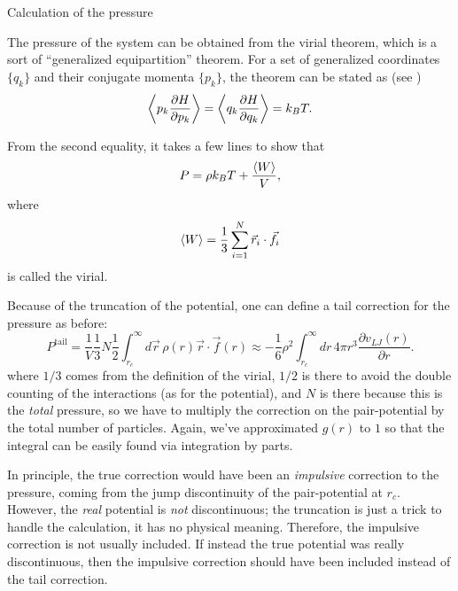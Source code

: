 \documentclass[10pt, compress, protectframetitle, handout]{beamer}
\begin{document}
\begin{frame}[allowframebreaks]{Calculation of the pressure}

	The pressure of the system can be obtained from the \alert{virial theorem}, which is a sort of ``generalized equipartition'' theorem. For a set of generalized coordinates $\{q_k\}$ and their conjugate momenta $\{p_k\}$, the theorem can be stated as (see \cite{Galli})
	\begin{equation}
		\Braket{p_k\frac{\partial H}{\partial p_k}} = \Braket{q_k\frac{\partial H}{\partial q_k}} = k_BT.
	\end{equation}
	
	From the second equality, it takes a few lines to show that
	\begin{equation}
		P = \rho k_B T + \frac{\Braket{W}}{V},
	\end{equation}
	where
	\begin{equation}
		\Braket{W} = \frac{1}{3} \sum_{i=1}^{N} \vec{r}_{i} \cdot \vec{f}_{i} 
	\end{equation}
	is called the \alert{virial}.
	
	Because of the truncation of the potential, one can define a tail correction for the pressure as before:
	\begin{equation}
		P^{\text{tail}} = \frac{1}{V}\frac{1}{3}N\frac{1}{2}\int_{r_c}^{\infty}d\vec{r}\,\rho(r) \vec{r} \cdot \vec{f}(r) \approx -\frac{1}{6}\rho^2\int_{r_c}^{\infty}dr\,4\pi r^3\frac{\partial v_{LJ}(r)}{\partial r}.
	\end{equation}
	where $1/3$ comes from the definition of the virial, $1/2$ is there to avoid the double counting of the interactions (as for the potential), and $N$ is there because this is the \emph{total} pressure, so we have to multiply the correction on the pair-potential by the total number of particles. Again, we've approximated $g(r)$ to $1$ so that the integral can be easily found via integration by parts.
	
	In principle, the true correction would have been an \emph{impulsive} correction to the pressure, coming from the jump discontinuity of the pair-potential at $r_c$. However, the \emph{real} potential is \emph{not} discontinuous; the truncation is just a trick to handle the calculation, it has no physical meaning. Therefore, the impulsive correction is not usually included. If instead the true potential was really discontinuous, then the impulsive correction should have been included instead of the tail correction.

\end{frame}
\end{document}
